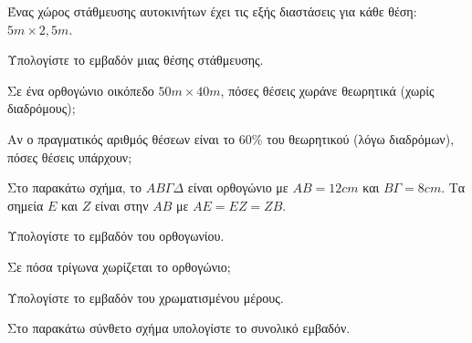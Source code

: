 \documentclass[11pt,a4paper,modern]{FFExercises}
\begin{document}
\askhsh Ένας χώρος στάθμευσης αυτοκινήτων έχει τις εξής διαστάσεις για κάθε θέση: $5\si{m}\times 2{,}5\si{m}$.
\begin{alist}
\item Υπολογίστε το εμβαδόν μιας θέσης στάθμευσης.
\item Σε ένα ορθογώνιο οικόπεδο $50\si{m}\times 40\si{m}$, πόσες θέσεις χωράνε θεωρητικά (χωρίς διαδρόμους);
\item Αν ο πραγματικός αριθμός θέσεων είναι το $60\%$ του θεωρητικού (λόγω διαδρόμων), πόσες θέσεις υπάρχουν;
\end{alist}
\askhsh Στο παρακάτω σχήμα, το $AB\varGamma\varDelta$ είναι ορθογώνιο με $AB=12\si{cm}$ και $B\varGamma=8\si{cm}$. Τα σημεία $E$ και $Z$ είναι στην $AB$ με $AE=EZ=ZB$.
\begin{center}
\end{center}
\begin{alist}
\item Υπολογίστε το εμβαδόν του ορθογωνίου.
\item Σε πόσα τρίγωνα χωρίζεται το ορθογώνιο;
\item Υπολογίστε το εμβαδόν του χρωματισμένου μέρους.
\end{alist}
\askhsh Στο παρακάτω σύνθετο σχήμα υπολογίστε το συνολικό εμβαδόν.
\begin{center}
\end{center}
\end{document}
